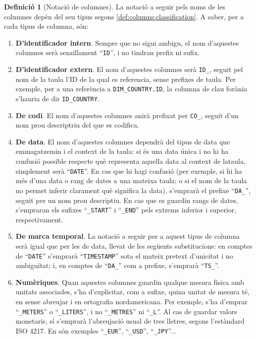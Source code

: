 \documentclass{article}
\theoremstyle{definition}
\newtheorem{definition}{Definició}
\begin{document}
\begin{definition}[Notació de columnes]\label{def:columns:notation}
La notació a seguir pels noms de les columnes depèn del seu tipus segons \cref{def:columns:classification}. A saber, per a cada tipus de columna, són:
\begin{enumerate}
  \item \textbf{D'identificador intern}. Sempre que no sigui ambigu, el nom d'aquestes columnes serà senzillament ``\verb|ID|'', i no tindran prefix ni sufix.

  \item \textbf{D'identificador extern}. El nom d'aquestes columnes serà \verb|ID_|, seguit pel nom de la taula l'ID de la qual es referencia, sense prefixes de taula. Per exemple, per a una referència a \verb|DIM_COUNTRY.ID|, la columna de clau forània s'hauria de dir \verb|ID_COUNTRY|.

  \item \textbf{De codi}. El nom d'aquestes columnes anirà prefixat per \verb|CO_|, seguit d'un nom prou descriptriu del que es codifica.

  \item \textbf{De data}. El nom d'aquestes columnes dependrà del tipus de data que emmagatzemin i el context de la taula: si és una data única i no hi ha confusió possible respecte què representa aquella data al context de lataula, simplement serà ``\verb|DATE|''. En cas que hi hagi confusió (per exemple, si hi ha més d'una data o rang de dates a una mateixa taula; o si el nom de la taula no permet inferir clarament què significa la data), s'emprarà el prefixe ``\verb|DA_|'', seguit per un nom prou descriptiu. En cas que es guardin rangs de dates, s'empraran els sufixes ``\verb|_START|'' i ``\verb|_END|'' pels extrems inferior i superior, respectivament.

  \item \textbf{De marca temporal}. La notació a seguir per a aquest tipus de columna serà igual que per les de data, llevat de les següents substitucions: en comptes de ``\verb|DATE|'' s'emprarà ``\verb|TIMESTAMP|'' sota el mateix pretext d'unicitat i no ambiguïtat; i, en comptes de ``\verb|DA_|'' com a prefixe, s'emprarà ``\verb|TS_|''.

  \item \textbf{Numèriques}. Quan aquestes columnes guardin qualque mesura física amb unitats associades, s'ha d'explicitar, com a sufixe, quina unitat de mesura té, en sense abreujar i en ortografia nordamericana. Per exemple, s'ha d'emprar ``\verb|_METERS|'' o ``\verb|_LITERS|'', i no ``\verb|_METRES|'' ni ``\verb|_L|''. Al cas de guardar valors monetaris, sí s'emprarà l'abreujació usual de tres lletres, segons l'estàndard ISO 4217. En són exemples ``\verb|_EUR|'', ``\verb|_USD|'', ``\verb|_JPY|''...


\end{enumerate}
\end{definition}
\end{document}
